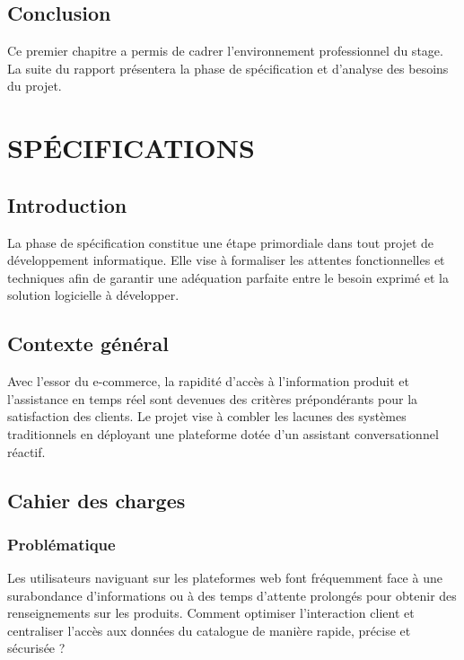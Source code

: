 \documentclass[12pt, a4paper, oneside]{report}
\begin{document}
\section{Conclusion}
Ce premier chapitre a permis de cadrer l'environnement professionnel du stage. La suite du rapport présentera la phase de spécification et d'analyse des besoins du projet.

\chapter{SPÉCIFICATIONS}

\section{Introduction}
La phase de spécification constitue une étape primordiale dans tout projet de développement informatique. Elle vise à formaliser les attentes fonctionnelles et techniques afin de garantir une adéquation parfaite entre le besoin exprimé et la solution logicielle à développer.

\section{Contexte général}
Avec l'essor du e-commerce, la rapidité d'accès à l'information produit et l'assistance en temps réel sont devenues des critères prépondérants pour la satisfaction des clients. Le projet vise à combler les lacunes des systèmes traditionnels en déployant une plateforme dotée d'un assistant conversationnel réactif.

\section{Cahier des charges}

\subsection{Problématique}
Les utilisateurs naviguant sur les plateformes web font fréquemment face à une surabondance d'informations ou à des temps d'attente prolongés pour obtenir des renseignements sur les produits. Comment optimiser l'interaction client et centraliser l'accès aux données du catalogue de manière rapide, précise et sécurisée ?
\end{document}
